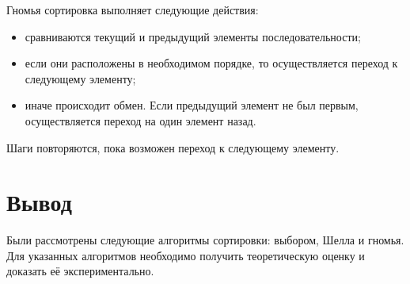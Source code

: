 Гномья сортировка \cite{gnome-sort} выполняет следующие действия:

\begin{itemize}
	\item сравниваются текущий и предыдущий элементы последовательности;
	\item если они расположены в необходимом порядке, то осуществляется переход к следующему элементу;
	\item иначе происходит обмен. Если предыдущий элемент не был первым, осуществляется переход на один элемент назад.
\end{itemize}

Шаги повторяются, пока возможен переход к следующему элементу.

\section*{Вывод}

Были рассмотрены следующие алгоритмы сортировки: выбором, Шелла и гномья. Для указанных алгоритмов необходимо получить теоретическую оценку и доказать её экспериментально.